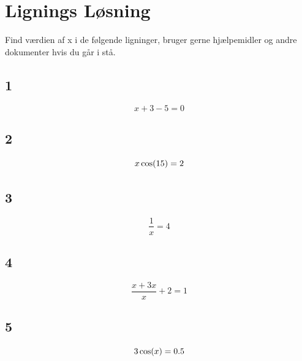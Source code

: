 \section{Lignings Løsning}
Find værdien af x i de følgende ligninger, bruger gerne hjælpemidler og andre dokumenter hvis du går i stå.

\subsection*{1}
\[
x+3-5 = 0
\]

\subsection*{2}
\[
x\operatorname{cos}(15) = 2
\]

\subsection*{3}
\[
\frac{1}{x} = 4
\]

\subsection*{4}
\[
\frac{x+3x}{x} +2 = 1
\]

\subsection*{5}
\[
3\operatorname{cos}(x) = 0.5
\]

